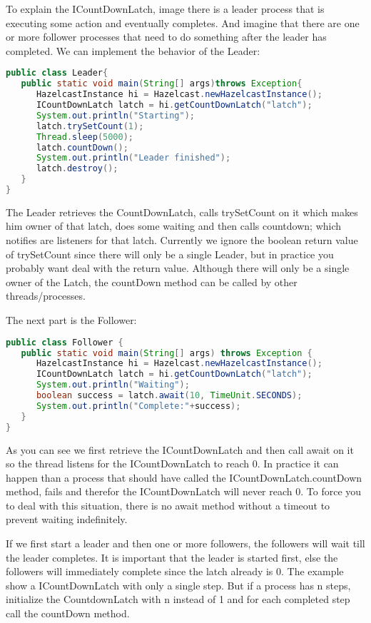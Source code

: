 To explain the ICountDownLatch, image there is a leader process that is executing some action and eventually completes. And imagine that there are one or more follower processes that need to do something after the leader has completed. We can implement the behavior of the Leader:
\begin{lstlisting}[language=java]
public class Leader{
   public static void main(String[] args)throws Exception{
      HazelcastInstance hi = Hazelcast.newHazelcastInstance();
      ICountDownLatch latch = hi.getCountDownLatch("latch");      
      System.out.println("Starting");
      latch.trySetCount(1); 
      Thread.sleep(5000);
      latch.countDown();
      System.out.println("Leader finished");
      latch.destroy();
   }
}
\end{lstlisting}
The Leader retrieves the CountDownLatch, calls trySetCount on it which makes him owner of that latch, does some waiting and then calls countdown; which notifies are listeners for that latch. Currently we ignore the boolean return value of trySetCount since there will only be a single Leader, but in practice you probably want deal with the return value. Although there will only be a single owner of the Latch, the countDown method can be called by other threads/processes.

The next part is the Follower:
\begin{lstlisting}[language=java]
public class Follower {
   public static void main(String[] args) throws Exception {
      HazelcastInstance hi = Hazelcast.newHazelcastInstance();
      ICountDownLatch latch = hi.getCountDownLatch("latch");
      System.out.println("Waiting");
      boolean success = latch.await(10, TimeUnit.SECONDS);
      System.out.println("Complete:"+success);
   }
}
\end{lstlisting}
As you can see we first retrieve the ICountDownLatch and then call await on it so the thread listens for the ICountDownLatch to reach 0. In practice it can happen than a process that should have called the ICountDownLatch.countDown method, fails and therefor the ICountDownLatch will never reach 0. To force you to deal with this situation, there is no await method without a timeout to prevent waiting indefinitely. 

If we first start a leader and then one or more followers, the followers will wait till the leader completes. It is important that the leader is started first, else the followers will immediately complete since the latch already is 0. The example show a ICountDownLatch with only a single step. But if a process has n steps, initialize the CountdownLatch with n instead of 1 and for each completed step call the countDown method.

